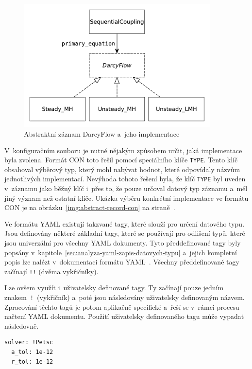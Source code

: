 \documentclass[FM,bw,DP]{tulthesis}
\begin{document}
\begin{figure}[h]
	\centering
    \includegraphics[height=190pt]{../img/abstract_record_darcyflow.pdf}
    \caption{Abstraktní záznam DarcyFlow a~jeho implementace}
	\label{img:abstract_record_darcyflow}
\end{figure}

V~konfiguračním souboru je nutné nějakým způsobem určit, jaká implementace byla zvolena. Formát \gls{CON} toto řešil pomocí speciálního klíče \texttt{TYPE}. Tento klíč obsahoval výběrový typ, který mohl nabývat hodnot, které odpovídaly názvům jednotlivých implementací. Nevýhoda tohoto řešení byla, že klíč \texttt{TYPE} byl uveden v~záznamu jako běžný klíč i~přes to, že pouze určoval datový typ záznamu a~měl jiný význam než ostatní klíče. Ukázka výběru konkrétní implementace ve formátu CON je na obrázku~\ref{img:abstract-record-con} na straně~\pageref{img:abstract-record-con}.

Ve formátu \gls{YAML} existují takzvané tagy, které slouží pro určení datového typu. Jsou definovány některé základní tagy, které se používají pro odlišení typů, které jsou univerzální pro všechny \gls{YAML} dokumenty. Tyto předdefinované tagy byly popsány v~kapitole~\ref{sec:analyza-yaml-zapis-datovych-typu} a~jejich kompletní popis lze nalézt v~dokumentaci formátu \gls{YAML}~\cite{bib:yaml}. Všechny předdefinované tagy začínají \texttt{!!} (dvěma vykřičníky).

Lze ovšem využít i~uživatelsky definované tagy. Ty začínají pouze jedním znakem~\texttt{!}~(vykřičník) a~poté jsou následovány uživatelsky definovaným názvem. Zpracování těchto tagů je potom aplikačně specifické a~řeší se v~rámci procesu načtení \gls{YAML} dokumentu. Použití uživatelsky definovaného tagu může vypadat následovně.

\lstset{style=short}
\vspace{5pt}
\begin{lstlisting}
solver: !Petsc
  a_tol: 1e-12
  r_tol: 1e-12
\end{lstlisting}
\vspace{-20pt}
\end{document}
